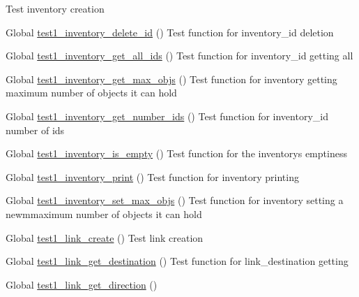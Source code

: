 \begin{DoxyRefList}
%
Test inventory creation  
\item[Global \mbox{\hyperlink{inventory__test_8c_a30d80ddf084113e14192c7a5031528c5}{test1\+\_\+inventory\+\_\+delete\+\_\+id}} ()]\label{test__test000423}%
%
Test function for inventory\+\_\+id deletion  
\item[Global \mbox{\hyperlink{inventory__test_8c_a5216ab857fac087b73d2428099356823}{test1\+\_\+inventory\+\_\+get\+\_\+all\+\_\+ids}} ()]\label{test__test000434}%
%
Test function for inventory\+\_\+id getting all  
\item[Global \mbox{\hyperlink{inventory__test_8c_a42b51a5b53baf38bddce941a7703d18a}{test1\+\_\+inventory\+\_\+get\+\_\+max\+\_\+objs}} ()]\label{test__test000441}%
%
Test function for inventory getting maximum number of objects it can hold  
\item[Global \mbox{\hyperlink{inventory__test_8c_a45ded03460e61fe4d5c899d24a9d50c5}{test1\+\_\+inventory\+\_\+get\+\_\+number\+\_\+ids}} ()]\label{test__test000428}%
%
Test function for inventory\+\_\+id number of ids  
\item[Global \mbox{\hyperlink{inventory__test_8c_afe8c9730e30b58535afc0481970ab2b1}{test1\+\_\+inventory\+\_\+is\+\_\+empty}} ()]\label{test__test000415}%
%
Test function for the inventory\textquotesingle{}s emptiness  
\item[Global \mbox{\hyperlink{inventory__test_8c_a7229ceb1916b0da955d23598da89d5ea}{test1\+\_\+inventory\+\_\+print}} ()]\label{test__test000438}%
%
Test function for inventory printing  
\item[Global \mbox{\hyperlink{inventory__test_8c_ace30873f717c8e9e5ffe5e8017474d77}{test1\+\_\+inventory\+\_\+set\+\_\+max\+\_\+objs}} ()]\label{test__test000444}%
%
Test function for inventory setting a newmmaximum number of objects it can hold  
\item[Global \mbox{\hyperlink{link__test_8c_a82c5ee441ad22caad8272212a9e9cc26}{test1\+\_\+link\+\_\+create}} ()]\label{test__test000446}%
%
Test link creation  
\item[Global \mbox{\hyperlink{link__test_8c_ade4160ca2a1f9ae14cff213a241da3fd}{test1\+\_\+link\+\_\+get\+\_\+destination}} ()]\label{test__test000464}%
%
Test function for link\+\_\+destination getting  
\item[Global \mbox{\hyperlink{link__test_8c_abf17aac1ac422711d09a1e2164e6a2d5}{test1\+\_\+link\+\_\+get\+\_\+direction}} ()]\label{test__test000466}%

\end{DoxyRefList}
